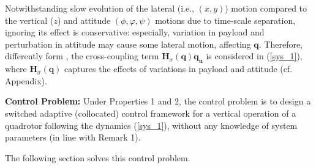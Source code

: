 \documentclass[AMA,STIX1COL,sort, compress]{WileyNJD-v2}
\begin{document}
\begin{remark}
	Notwithstanding slow evolution of the lateral (i.e., $(x,y)$) motion compared to the vertical ($z$) and attitude $( \phi, \varphi, \psi )$ motions due to time-scale separation, ignoring its effect is conservative: especially, variation in payload and perturbation in attitude may cause some lateral motion, affecting $\mathbf{q}$. Therefore, differently form \cite{mofid2018adaptive, nicol2011robust}, the cross-coupling term $\mathbf{H}_\sigma( \mathbf q)\ddot{ \mathbf{q}}_{\mathbf u}$ is considered in (\ref{sys_1}), where $\mathbf{H}_\sigma( \mathbf q)$ captures the effects of variations in payload and attitude (cf. Appendix).
\end{remark}
\textbf{Control Problem:} Under Properties 1 and 2, the control problem is to design a switched adaptive (collocated) control framework for a vertical operation of a quadrotor following the dynamics (\ref{sys_1}), without any knowledge of system parameters (in line with Remark 1). %

The following section solves this control problem. 
\end{document}
